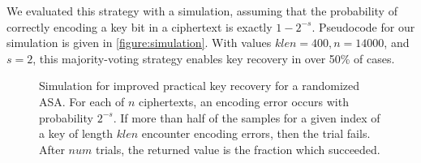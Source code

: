 \iffullversion
We evaluated this strategy with a simulation, assuming that the probability of correctly encoding a key bit in a ciphertext is exactly $1-2^{-s}$. Pseudocode for our simulation is given in \autoref{figure:simulation}. With values $klen=400, n=14000$, and $s=2$, this majority-voting strategy enables key recovery in over 50\% of cases.

\begin{figure}[t]
\centering
{}
\caption[Simulation for improved practical key recovery for a randomized ASA]{Simulation for improved practical key recovery for a randomized ASA. For each of $n$ ciphertexts, an encoding error occurs with probability $2^{-s}$. If more than half of the samples for a given index of a key of length $klen$ encounter encoding errors, then the trial fails. After $num$ trials, the returned value is the fraction which succeeded.}
\label{figure:simulation}
\end{figure}

